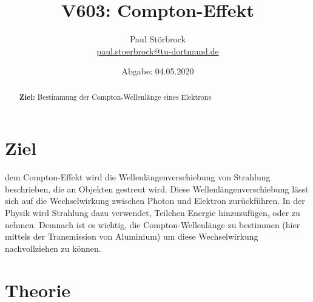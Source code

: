 


    \title{V603: Compton-Effekt}
    \author{  
    Paul Störbrock\\
    \texorpdfstring{\href{mailto:paul.stoerbrock@tu-dortmund.de}{paul.stoerbrock@tu-dortmund.de}}{}
    }
    \date{Abgabe: 04.05.2020\vspace{-4ex}}
\maketitle
    
    \begin{abstract}
    \centering
        \textbf{Ziel:} Bestimmung der Compton-Wellenlänge eines Elektrons
    \end{abstract}

\newpage
\tableofcontents
\newpage

\setcounter{page}{1}

\section{Ziel}

    \justifying dem Compton-Effekt wird die Wellenlängenverschiebung von Strahlung beschrieben, die an Objekten gestreut wird. Diese Wellenlängenverschiebung
    lässt sich auf die Wechselwirkung zwischen Photon und Elektron zurückführen. In der Physik wird Strahlung dazu verwendet, Teilchen Energie hinzuzufügen, oder 
    zu nehmen. Demnach ist es wichtig, die Compton-Wellenlänge zu bestimmen (hier mittels der Transmission von Aluminium) um diese Wechselwirkung nachvollziehen zu können.

\section{Theorie}

